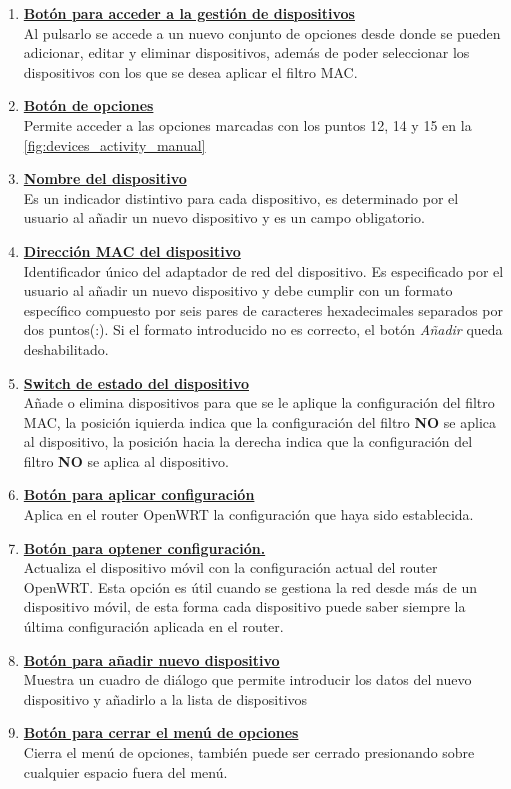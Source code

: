 \documentclass[12pt, twoside]{article}
\begin{document}
\begin{enumerate}
            \item \textbf{\underline{Botón para acceder a la gestión de dispositivos}} \\
            Al pulsarlo se accede a un nuevo conjunto de opciones desde donde se pueden adicionar, editar y eliminar dispositivos, además de poder seleccionar los dispositivos con los que se desea aplicar el filtro MAC.
            \item \textbf{\underline{Botón de opciones}} \\
            Permite acceder a las opciones marcadas con los puntos 12, 14 y 15 en la \ref{fig:devices_activity_manual}
            \item \textbf{\underline{Nombre del dispositivo}} \\
            Es un indicador distintivo para cada dispositivo, es determinado por el usuario al añadir un nuevo dispositivo y es un campo obligatorio.
            \item \textbf{\underline{Dirección MAC del dispositivo}} \\
            Identificador único del adaptador de red del dispositivo. Es especificado por el usuario al añadir un nuevo dispositivo y debe cumplir con un formato específico compuesto por seis pares de caracteres hexadecimales separados por dos puntos(:). Si el formato introducido no es correcto, el botón \textit{Añadir} queda deshabilitado.
            \item \textbf{\underline{Switch de estado del dispositivo}} \\
            Añade o elimina dispositivos para que se le aplique la configuración del filtro MAC, la posición iquierda indica que la configuración del filtro \textbf{NO} se aplica al dispositivo, la posición hacia la derecha indica que la configuración del filtro \textbf{NO} se aplica al dispositivo.
            \item \textbf{\underline{Botón para aplicar configuración}} \\
            Aplica en el router OpenWRT la configuración que haya sido establecida.
            \item \textbf{\underline{Botón para optener configuración.}} \\
            Actualiza el dispositivo móvil con la configuración actual del router OpenWRT. Esta opción es útil cuando se gestiona la red desde más de un dispositivo móvil, de esta forma cada dispositivo puede saber siempre la última configuración aplicada en el router.
            \item \textbf{\underline{Botón para añadir nuevo dispositivo}} \\
            Muestra un cuadro de diálogo que permite introducir los datos del nuevo dispositivo y añadirlo a la lista de dispositivos
            \item \textbf{\underline{Botón para cerrar el menú de opciones}} \\
            Cierra el menú de opciones, también puede ser cerrado presionando sobre cualquier espacio fuera del menú.
            
        \end{enumerate}
\end{document}
